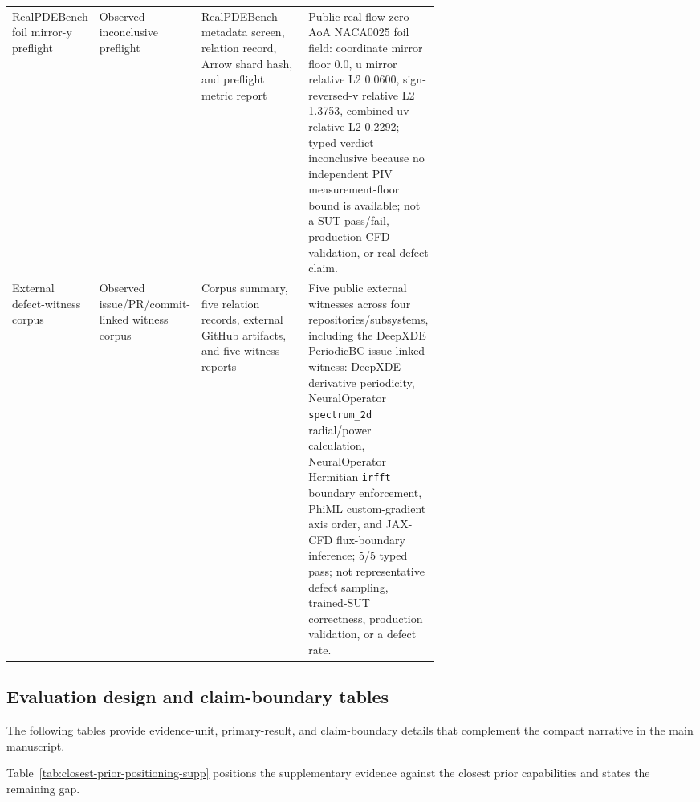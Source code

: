 {\begin{xltabular}{\linewidth}{@{}>{\raggedright\arraybackslash}p{0.19\linewidth}>{\raggedright\arraybackslash}p{0.18\linewidth}>{\raggedright\arraybackslash}p{0.25\linewidth}Y@{}}
RealPDE\-Bench foil mirror-y preflight & Observed inconclusive preflight & RealPDE\-Bench metadata screen, relation record, Arrow shard hash, and preflight metric report & Public real-flow zero-AoA NACA0025 foil field: coordinate mirror floor 0.0, u mirror relative L2 0.0600, sign-reversed-v relative L2 1.3753, combined uv relative L2 0.2292; typed verdict inconclusive because no independent PIV measurement-floor bound is available; not a SUT pass/fail, production-CFD validation, or real-defect claim. \\
External defect-witness corpus & Observed issue/PR/commit-linked witness corpus & Corpus summary, five relation records, external GitHub artifacts, and five witness reports & Five public external witnesses across four repositories/subsystems, including the DeepXDE PeriodicBC issue-linked witness: DeepXDE derivative periodicity, NeuralOperator \texttt{spectrum\_2d} radial/power calculation, NeuralOperator Hermitian \texttt{irfft} boundary enforcement, PhiML custom-gradient axis order, and JAX-CFD flux-boundary inference; 5/5 typed pass; not representative defect sampling, trained-SUT correctness, production validation, or a defect rate. \\
\end{xltabular}
}

\subsection{Evaluation design and claim-boundary tables}
\label{app:evaluation-design-claim-boundaries}

The following tables provide evidence-unit, primary-result, and claim-boundary details that complement the compact narrative in the main manuscript.

Table~\ref{tab:closest-prior-positioning-supp} positions the supplementary
evidence against the closest prior capabilities and states the remaining gap.

